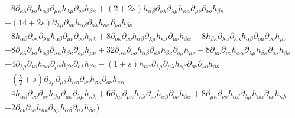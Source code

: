 \documentclass[a4paper,12pt]{article}
\begin{document}
\begin{equation}
\begin{array}{l}
   + 8\partial _{\kappa\lambda} \partial _{\nu o} h_{\alpha\beta} \partial _{\mu\alpha} h_{\lambda\mu} \partial _{ o\nu} h_{\beta\kappa}  + (2 + 2s)h_{\alpha\beta} \partial _{ o\lambda} \partial _{\lambda\mu} h_{\kappa\alpha} \partial _{\mu\nu} \partial _{\nu o} h_{\beta\kappa} \\ + (14 + 2s)\partial _{\lambda\mu} \partial _{\mu\nu} h_{\alpha\beta} \partial _{ o\lambda} h_{\kappa\alpha} \partial _{\nu o} h_{\beta\kappa}  \\
   - 8h_{\alpha\beta} \partial _{ o\kappa} \partial _{\lambda\mu} h_{\alpha\beta} \partial _{\mu\nu} \partial _{\nu o} h_{\kappa\lambda}  + 8\partial _{ o\kappa} \partial _{\nu o} h_{\alpha\beta} \partial _{\lambda\mu} h_{\kappa\lambda} \partial _{\mu\nu} h_{\beta\alpha}  - 8h_{\beta\kappa} \partial _{\lambda\alpha} \partial _{\kappa\lambda} h_{\alpha\beta} \partial _{ o\mu} \partial _{\nu o} h_{\mu\nu}   \\
   + 8\partial _{\kappa\lambda} \partial _{\nu o} h_{\alpha\beta} \partial _{\lambda\alpha} h_{\beta\kappa} \partial _{ o\mu} h_{\mu\nu}  + 32\partial _{\lambda\alpha} \partial _{\nu o} h_{\alpha\beta} \partial _{\kappa\lambda} h_{\beta\kappa} \partial _{ o\mu} h_{\mu\nu}  - 8\partial _{\mu\nu} \partial _{\nu o} h_{\alpha\alpha} \partial _{\lambda\mu} h_{\beta\kappa} \partial _{ o\lambda} h_{\beta\kappa}  \\
   + 4\partial _{\lambda\mu} \partial _{\nu o} h_{\alpha\alpha} \partial _{\mu\nu} h_{\beta\kappa} \partial _{ o\lambda} h_{\beta\kappa}  - (1 + s)h_{\kappa\alpha} \partial _{\lambda\mu} \partial _{\mu\lambda} h_{\alpha\beta} \partial _{ o\nu} \partial _{\nu o} h_{\beta\kappa} \\ - (\frac{5}
{2} + s)\partial _{\lambda\mu} \partial _{\mu\lambda} h_{\alpha\beta} \partial _{\nu o} h_{\beta\kappa} \partial _{ o\nu} h_{\kappa\alpha}   \\
   + 4h_{\alpha\beta} \partial _{\nu o} \partial _{ o\nu} h_{\beta\alpha} \partial _{\mu\kappa} \partial _{\lambda\mu} h_{\kappa\lambda}  + 6\partial _{\lambda\mu} \partial _{\mu\kappa} h_{\kappa\lambda} \partial _{\nu o} h_{\alpha\beta} \partial _{ o\nu} h_{\beta\alpha}  + 8\partial _{\mu\kappa} \partial _{\nu o} h_{\alpha\beta} \partial _{\lambda\mu} h_{\beta\alpha} \partial _{ o\nu} h_{\kappa\lambda}  \\
   + 2\partial _{ o\nu} \partial _{\nu o} h_{\kappa\kappa} \partial _{\lambda\mu} h_{\alpha\beta} \partial _{\mu\lambda} h_{\beta\alpha})  \\
\end{array}
\end{equation}
\end{document}
